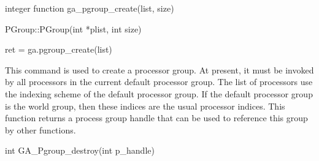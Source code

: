 \documentclass[10pt]{article}
\begin{document}
\begin{fapi}
\begin{fcode}
integer function ga_pgroup_create(list, size)
\end{fcode}
\begin{funcargs}
\end{funcargs}
\end{fapi}

\begin{cxxapi}
\begin{cxxcode}
PGroup::PGroup(int *plist, int size)
\end{cxxcode}
\begin{funcargs}
\end{funcargs}
\end{cxxapi}

\begin{pyapi}
\begin{pycode}
ret = ga.pgroup_create(list)
\end{pycode}
\begin{funcargs}
\end{funcargs}
\end{pyapi}

\dcoll

\begin{desc}

This command is used to create a processor group. At present, it must be
invoked by all processors in the current default processor group. The list of
processors use the indexing scheme of the default processor group. If the
default processor group is the world group, then these indices are the usual
processor indices. This function returns a process group handle that can be
used to reference this group by other functions.

\end{desc}


\begin{capi}
\begin{ccode}
int GA_Pgroup_destroy(int p_handle)
\end{ccode}
\begin{funcargs}
\end{funcargs}
\end{capi}
\end{document}

